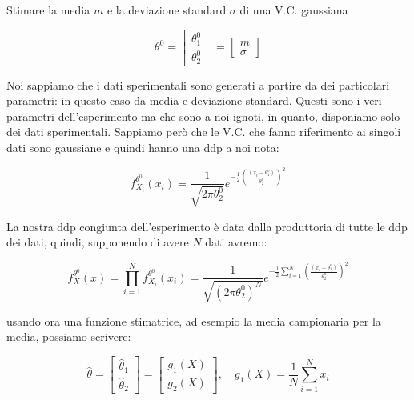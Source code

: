 \begin{esempio}

Stimare la media $m$ e la deviazione standard $\sigma$ di una V.C. gaussiana

  \[ \theta^0=\begin{bmatrix}\theta_1^0 \\ \theta_2^0  \end{bmatrix}=\begin{bmatrix} m \\ \sigma \end{bmatrix} \]

Noi sappiamo che i dati sperimentali sono generati a partire da dei particolari parametri:
in questo caso da media e deviazione standard. Questi sono i veri parametri dell'esperimento ma che sono a noi ignoti, in quanto, disponiamo solo dei dati sperimentali. Sappiamo però che le V.C. che fanno riferimento ai singoli dati sono gaussiane e quindi hanno una ddp a noi nota:

    \[ f_{X_i}^{\theta^0}(x_i)= \frac{1}{\sqrt{2\pi \theta_2^0} }e^{- \frac{1}{2} \left( \frac{(x_i-\theta_1^o)}{\theta_2^0} \right) ^2}  \]

La nostra ddp congiunta dell'esperimento è data dalla produttoria di tutte le ddp dei dati, quindi, supponendo di avere $N$ dati avremo:

    \[ f_X^{\theta^0}(x)=\prod_{i=1}^{N} f_{X_i}^{\theta^0}(x_i)  = \frac{1}{\sqrt{(2\pi \theta_2^0)^N} }e^{- \frac{1}{2}  \sum_{i=1}^{N}{ \left( \frac{(x_i-\theta_1^o)}{\theta_2^0} \right) ^2}  } \]

usando ora una funzione stimatrice, ad esempio la media campionaria per la media, possiamo scrivere:

  \[
    \hat{\theta} = \begin{bmatrix} \hat{\theta}_1 \\ \hat{\theta}_2 \end{bmatrix} =  \begin{bmatrix} g_1(X) \\ g_2(X) \end{bmatrix} , \quad g_1(X)=\frac{1}{N}\sum _{i=1} ^{N} {x_i}
  \]
\end{esempio}
